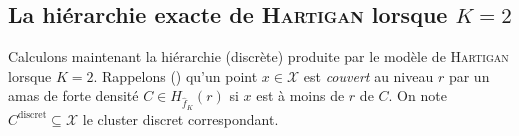 \subsection{La hiérarchie exacte de \textsc{Hartigan} lorsque $K=2$}

Calculons maintenant la hiérarchie (discrète) produite par le modèle de \textsc{Hartigan} lorsque $K=2$.
Rappelons () qu'un point $x\in\mathcal X$ est \emph{couvert} au niveau $r$ par un amas de forte densité $ C \in H_{\widehat f_K}(r)$ si $x $ est à moins de $r$ de $C$. On note $C^{\mathrm{discret}} \subseteq \mathcal X$ le cluster discret correspondant.


\begin{figure}[htbp]
    \centering
    
    \begin{subfigure}[b]{0.45\textwidth}
        \centering
\end{subfigure}
\end{figure}
